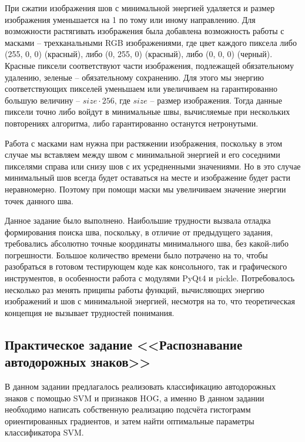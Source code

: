 \documentclass[a4paper, 12pt]{article}
\begin{document}
При сжатии изображения шов с минимальной энергией удаляется и размер изображения уменьшается на 1 по тому или иному направлению. Для возможности растягивать изображения была добавлена возможность работы с масками -- трехканальными RGB изображениями, где цвет каждого пиксела либо (255, 0, 0) (красный), либо (0, 255, 0) (красный), либо (0, 0, 0) (черный). Красные пиксели соответствуют части изображения, подлежащей обязательному удалению, зеленые -- обязательному сохранению. Для этого мы энергию соответствующих пикселей уменьшаем или увеличиваем на гарантированно большую величину -- $size\cdot 256$, где $size$ -- размер изображения. Тогда данные пиксели точно либо войдут в минимальные швы, вычисляемые при нескольких повторениях алгоритма, либо гарантированно останутся нетронутыми.

Работа с масками нам нужна при растяжении изображения, поскольку в этом случае мы вставляем между швом с минимальной энергией и его соседними пикселями справа или снизу шов с их усредненными значениями. Но в это случае минимальный шов всегда будет оставаться на месте и изображение будет расти неравномерно. Поэтому при помощи маски мы увеличиваем значение энергии точек данного шва.

Данное задание было выполнено. Наибольшие трудности вызвала отладка формирования поиска шва, поскольку, в отличие от предыдущего задания, требовались абсолютно точные координаты минимального шва, без какой-либо погрешности. Большое количество времени было потрачено на то, чтобы разобраться в готовом тестирующем коде как консольного, так и графического инструментов, в особенности работа с модулями PyQt4 и pickle. Потребовалось несколько раз менять приципы работы функций, вычисляющих энергию изображений и шов с минимальной энергией, несмотря на то, что теоретическая концепция не вызывает трудностей понимания.



\newpage
\subsection*{Практическое задание <<Распознавание автодорожных знаков>>}
%

В данном задании предлагалось реализовать классификацию автодорожных знаков с помощью SVM и
признаков HOG, а именно В данном задании необходимо написать собственную реализацию подсчёта гистограмм ориентированных
градиентов, и затем найти оптимальные параметры классификатора SVM.
\end{document}

